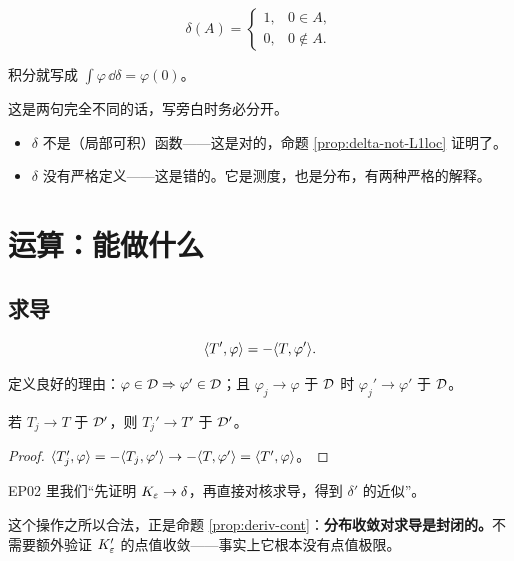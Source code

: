 \begin{equation}
\delta(A)=\begin{cases}1,&0\in A,\\0,&0\notin A .\end{cases}
\end{equation}

积分就写成 $\int\varphi\,\dd\delta=\varphi(0)$。

\begin{notebox}
这是两句完全不同的话，写旁白时务必分开。
\begin{itemize}[leftmargin=1.4em,itemsep=0.2em]
\item $\delta$ 不是（局部可积）函数——这是对的，命题 \ref{prop:delta-not-L1loc} 证明了。
\item $\delta$ 没有严格定义——这是错的。它是测度，也是分布，有两种严格的解释。
\end{itemize}
\end{notebox}

\section{运算：能做什么}

\subsection{求导}

\begin{equation}
\langle T',\varphi\rangle=-\langle T,\varphi'\rangle .
\end{equation}

定义良好的理由：$\varphi\in\mathcal{D}\Rightarrow\varphi'\in\mathcal{D}$；且 $\varphi_j\to\varphi$ 于 $\mathcal{D}$ 时 $\varphi_j'\to\varphi'$ 于 $\mathcal{D}$。

\begin{prop}\label{prop:deriv-cont}
若 $T_j\to T$ 于 $\mathcal{D}'$，则 $T_j'\to T'$ 于 $\mathcal{D}'$。
\end{prop}

\begin{proof}
$\langle T_j',\varphi\rangle=-\langle T_j,\varphi'\rangle\to-\langle T,\varphi'\rangle=\langle T',\varphi\rangle$。
\end{proof}

\begin{ideabox}
EP02 里我们“先证明 $K_\varepsilon\to\delta$，再直接对核求导，得到 $\delta'$ 的近似”。

这个操作之所以合法，正是命题 \ref{prop:deriv-cont}：\textbf{分布收敛对求导是封闭的。}不需要额外验证 $K_\varepsilon'$ 的点值收敛——事实上它根本没有点值极限。
\end{ideabox}

